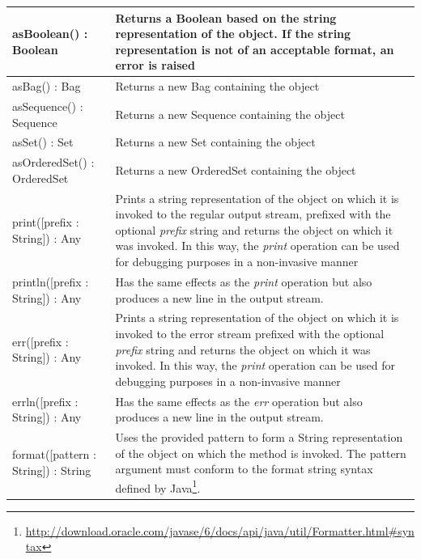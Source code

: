 \begin{longtabu} {|p{6.5cm}|X|}
			asBoolean() : Boolean & Returns a Boolean based on the string representation of the object. If the string representation is not of an acceptable format, an error is raised \\\hline
			
			asBag() : Bag & Returns a new Bag containing the object \\\hline
			
			asSequence() : Sequence & Returns a new Sequence containing the object \\\hline
			
			asSet() : Set & Returns a new Set containing the object \\\hline
			
			asOrderedSet() : OrderedSet & Returns a new OrderedSet containing the object \\\hline
			
			print([prefix : String]) : Any & Prints a string representation of the object on which it is invoked to the regular output stream, prefixed with the optional \emph{prefix} string and returns the object on which it was invoked. In this way, the \emph{print} operation can be used for debugging purposes in a non-invasive manner\\\hline
			
			println([prefix : String]) : Any & Has the same effects as the \emph{print} operation but also produces a new line in the output stream. \\\hline

			err([prefix : String]) : Any & Prints a string representation of the object on which it is invoked to the error stream prefixed with the optional \emph{prefix} string and returns the object on which it was invoked. In this way, the \emph{print} operation can be used for debugging purposes in a non-invasive manner\\\hline
			
			errln([prefix : String]) : Any & Has the same effects as the \emph{err} operation but also produces a new line in the output stream. \\\hline
			
			format([pattern : String]) : String & Uses the provided pattern to form a String representation of the object on which the method is invoked. The pattern argument must conform to the format string syntax defined by Java\footnote{\url{http://download.oracle.com/javase/6/docs/api/java/util/Formatter.html\#syntax}}. \\\hline

\end{longtabu}

